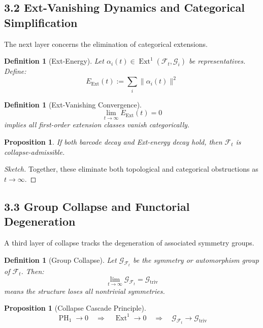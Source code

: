 \documentclass[11pt]{article}
\newtheorem{definition}[theorem]{Definition}
\newtheorem{proposition}[theorem]{Proposition}
\DeclareMathOperator{\Ext}{Ext}
\DeclareMathOperator{\PH}{PH}
\begin{document}
\subsection{3.2 Ext-Vanishing Dynamics and Categorical Simplification}

The next layer concerns the elimination of categorical extensions.

\begin{definition}[Ext-Energy]
Let $\alpha_i(t) \in \Ext^1(\mathcal{F}_t, \mathcal{G}_i)$ be representatives. Define:
\[
E_{\mathrm{Ext}}(t) := \sum_i \| \alpha_i(t) \|^2
\]
\end{definition}

\begin{definition}[Ext-Vanishing Convergence]
\[
\lim_{t \to \infty} E_{\mathrm{Ext}}(t) = 0
\]
implies all first-order extension classes vanish categorically.
\end{definition}

\begin{proposition}
If both barcode decay and Ext-energy decay hold, then $\mathcal{F}_t$ is collapse-admissible.
\end{proposition}

\begin{proof}[Sketch]
Together, these eliminate both topological and categorical obstructions as $t \to \infty$.
\end{proof}

\subsection{3.3 Group Collapse and Functorial Degeneration}

A third layer of collapse tracks the degeneration of associated symmetry groups.

\begin{definition}[Group Collapse]
Let $\mathcal{G}_{\mathcal{F}_t}$ be the symmetry or automorphism group of $\mathcal{F}_t$. Then:
\[
\lim_{t \to \infty} \mathcal{G}_{\mathcal{F}_t} = \mathcal{G}_{\mathrm{triv}}
\]
means the structure loses all nontrivial symmetries.
\end{definition}

\begin{proposition}[Collapse Cascade Principle]
\[
\PH_1 \to 0 \quad \Longrightarrow \quad \Ext^1 \to 0 \quad \Longrightarrow \quad \mathcal{G}_{\mathcal{F}_t} \to \mathcal{G}_{\mathrm{triv}}
\]
\end{proposition}
\end{document}
